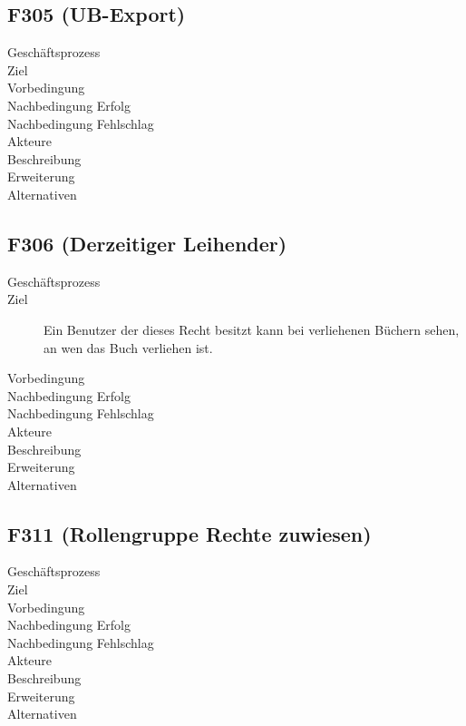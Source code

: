 \subsection{F305 (UB-Export)}
\begin{description}
  \item[Geschäftsprozess]
  \item[Ziel]
  \item[Vorbedingung]
  \item[Nachbedingung Erfolg]
  \item[Nachbedingung Fehlschlag]
  \item[Akteure]
  \item[Beschreibung]
  \item[Erweiterung]
  \item[Alternativen]
\end{description}

\subsection{F306 (Derzeitiger Leihender)}
\begin{description}
  \item[Geschäftsprozess]
  \item[Ziel]Ein Benutzer der dieses Recht besitzt kann bei verliehenen Büchern sehen, an wen das Buch verliehen ist.
  \item[Vorbedingung]
  \item[Nachbedingung Erfolg]
  \item[Nachbedingung Fehlschlag]
  \item[Akteure]
  \item[Beschreibung]
  \item[Erweiterung]
  \item[Alternativen]
\end{description}

\subsection{F311 (Rollengruppe Rechte zuwiesen)} 
\begin{description}
  \item[Geschäftsprozess]
  \item[Ziel]
  \item[Vorbedingung]
  \item[Nachbedingung Erfolg]
  \item[Nachbedingung Fehlschlag]
  \item[Akteure]
  \item[Beschreibung]
  \item[Erweiterung]
  \item[Alternativen]
\end{description}

